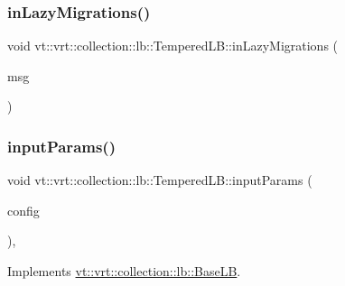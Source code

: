 \mbox{\label{structvt_1_1vrt_1_1collection_1_1lb_1_1_tempered_l_b_aa072b3bf3c82899d3228096b60de1647}} 
\subsubsection{\texorpdfstring{in\+Lazy\+Migrations()}{inLazyMigrations()}}
{\footnotesize\ttfamily void vt\+::vrt\+::collection\+::lb\+::\+Tempered\+L\+B\+::in\+Lazy\+Migrations (\begin{DoxyParamCaption}\item[{\hyperlink{structvt_1_1vrt_1_1collection_1_1balance_1_1_lazy_migration_msg}{balance\+::\+Lazy\+Migration\+Msg} $\ast$}]{msg }\end{DoxyParamCaption})\hspace{0.3cm}{\ttfamily [protected]}}

\mbox{\label{structvt_1_1vrt_1_1collection_1_1lb_1_1_tempered_l_b_aec119d63f5af1ce923578b70204ee622}} 
\subsubsection{\texorpdfstring{input\+Params()}{inputParams()}}
{\footnotesize\ttfamily void vt\+::vrt\+::collection\+::lb\+::\+Tempered\+L\+B\+::input\+Params (\begin{DoxyParamCaption}\item[{\hyperlink{structvt_1_1vrt_1_1collection_1_1balance_1_1_config_entry}{balance\+::\+Config\+Entry} $\ast$}]{config }\end{DoxyParamCaption})\hspace{0.3cm}{\ttfamily [override]}, {\ttfamily [virtual]}}



Implements \hyperlink{structvt_1_1vrt_1_1collection_1_1lb_1_1_base_l_b_acf56a0cc29f5e00c0dccf2003baa2f43}{vt\+::vrt\+::collection\+::lb\+::\+Base\+LB}.



